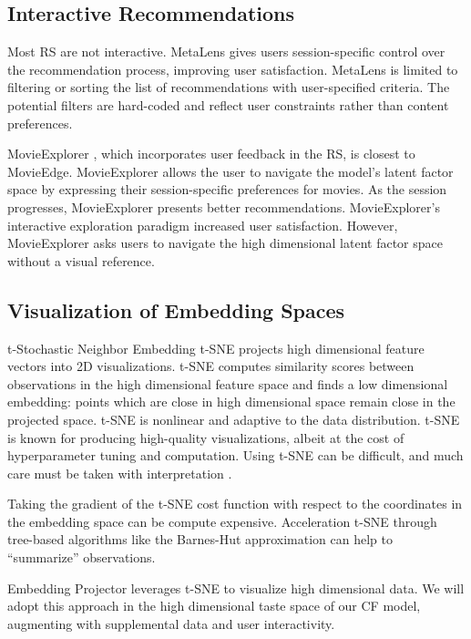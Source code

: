 \subsection{Interactive Recommendations}

Most RS are not interactive. MetaLens \cite{schafer2002meta} gives users session-specific control over the recommendation process, improving user satisfaction. MetaLens is limited to filtering or sorting the list of recommendations with user-specified criteria. The potential filters are hard-coded and reflect user constraints rather than content preferences. 

MovieExplorer \cite{taijala2018movieexplorer}, which incorporates user feedback in the RS, is closest to MovieEdge. MovieExplorer allows the user to navigate the model's latent factor space by expressing their session-specific preferences for movies.  As the session progresses, MovieExplorer presents better recommendations. MovieExplorer’s interactive exploration paradigm increased user satisfaction. However, MovieExplorer asks users to navigate the high dimensional latent factor space without a visual reference. 

\subsection{Visualization of Embedding Spaces}

t-Stochastic Neighbor Embedding \mbox{t-SNE} \cite{maaten2008visualizing} projects high dimensional feature vectors into 2D visualizations. \mbox{t-SNE} computes similarity scores between observations in the high dimensional feature space and finds a low dimensional embedding: points which are close in high dimensional space remain close in the projected space. \mbox{t-SNE} is nonlinear and adaptive to the data distribution. \mbox{t-SNE} is known for producing high-quality visualizations, albeit at the cost of hyperparameter tuning and computation. Using \mbox{t-SNE} can be difficult, and much care must be taken with interpretation \cite{wattenberg2016how}.

Taking the gradient of the \mbox{t-SNE} cost function with respect to the coordinates in the embedding space can be compute expensive.  Acceleration \mbox{t-SNE} through tree-based algorithms like the Barnes-Hut approximation \cite{van2014accelerating} can help to “summarize” observations.  

Embedding Projector \cite{smilkov2016embedding} leverages \mbox{t-SNE} to visualize high dimensional data. We will adopt this approach in the high dimensional taste space of our CF model, augmenting with supplemental data and user interactivity. 

